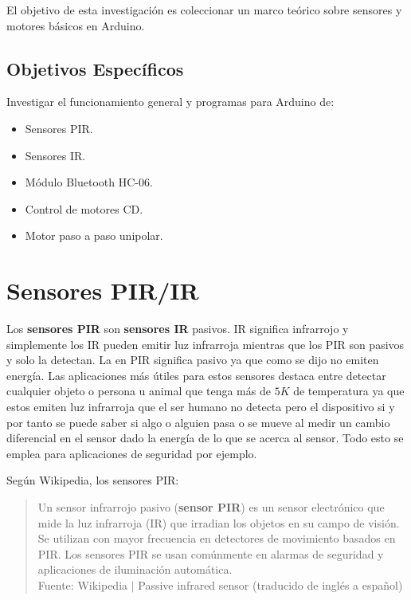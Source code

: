 \documentclass[conference]{IEEEtran}
\begin{document}
    El objetivo de esta investigación es coleccionar un marco teórico sobre sensores y motores básicos en Arduino.

    \subsection{Objetivos Específicos}

    Investigar el funcionamiento general y programas para Arduino de:

    \begin{itemize}
        \item Sensores PIR.
        \item Sensores IR.
        \item Módulo Bluetooth HC-06.
        \item Control de motores CD.
        \item Motor paso a paso unipolar.
    \end{itemize}

    \section{Sensores PIR/IR}

    Los \textbf{sensores PIR} son \textbf{sensores IR} pasivos. IR significa infrarrojo y simplemente los IR pueden emitir luz infrarroja mientras que los PIR son pasivos y solo la detectan. La  en PIR significa pasivo ya que como se dijo no emiten energía. Las aplicaciones más útiles para estos sensores destaca entre detectar cualquier objeto o persona u animal que tenga más de $5K$ de temperatura ya que estos emiten luz infrarroja que el ser humano no detecta pero el dispositivo si \cite{jost-ir-sensor-2019} y por tanto se puede saber si algo o alguien pasa o se mueve al medir un cambio diferencial en el sensor dado la energía de lo que se acerca al sensor. Todo esto se emplea para aplicaciones de seguridad por ejemplo.

    \bigbreak

    Según Wikipedia, los sensores PIR:

    \begin{quote}
        Un sensor infrarrojo pasivo (\textbf{sensor PIR}) es un sensor electrónico que mide la luz infrarroja (IR) que irradian los objetos en su campo de visión. Se utilizan con mayor frecuencia en detectores de movimiento basados en PIR. Los sensores PIR se usan comúnmente en alarmas de seguridad y aplicaciones de iluminación automática.\\
        \small Fuente: Wikipedia $\mid$ Passive infrared sensor (traducido de inglés a español) \cite{wikipedia-pir-sensor-2022}
    \end{quote}
\end{document}
